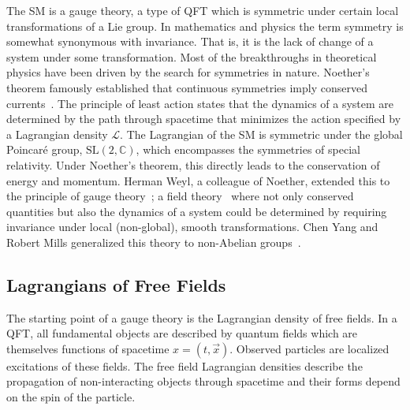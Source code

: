 The SM is a gauge theory, a type of QFT which is symmetric under certain local transformations of a Lie group.
In mathematics and physics the term symmetry is somewhat synonymous with invariance.
That is, it is the lack of change of a system under some transformation.
Most of the breakthroughs in theoretical physics have been driven by the search for symmetries in nature.
Noether's theorem famously established that continuous symmetries imply conserved currents~\cite{Noether1918}.
The principle of least action states that the dynamics of a system are determined by the path through spacetime that minimizes the action specified by a Lagrangian density $\mathcal{L}$.
The Lagrangian of the SM is symmetric under the global Poincaré group, $\text{SL}(2, \mathbb{C})$, which encompasses the symmetries of special relativity.
Under Noether's theorem, this directly leads to the conservation of energy and momentum.
Herman Weyl, a colleague of Noether, extended this to the principle of gauge theory~\cite{GaugeSym}; a field theory~\cite{Gordon1926} where not only conserved quantities but also the dynamics of a system could be determined by requiring invariance under local (non-global), smooth transformations.
Chen Yang and Robert Mills generalized this theory to non-Abelian groups~\cite{YangMills}.

\subsection{Lagrangians of Free Fields}

The starting point of a gauge theory is the Lagrangian density of free fields.
In a QFT, all fundamental objects are described by quantum fields which are themselves functions of spacetime $x = (t, \vec{x})$.
Observed particles are localized excitations of these fields.
The free field Lagrangian densities describe the propagation of non-interacting objects through spacetime and their forms depend on the spin of the particle.

